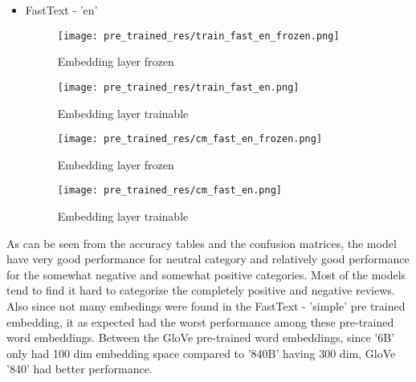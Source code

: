 \documentclass{article}
\begin{document}
\begin{itemize}
\begin{figure}[H]
\begin{minipage}{.5\textwidth}
    \end{minipage}
    \end{figure}
    
    \newpage
    \item FastText - 'en'
    \begin{figure}[H]
    \centering
    \begin{minipage}{.5\linewidth}
        \centering
        \texttt{[image: pre\_trained\_res/train\_fast\_en\_frozen.png]}
        \vspace{-1.0em}
        \caption{Embedding layer frozen}

    \end{minipage}%
    \begin{minipage}{.5\textwidth}
      \centering
      \texttt{[image: pre\_trained\_res/train\_fast\_en.png]}
      \vspace{-1.0em}
      \caption{Embedding layer trainable}

    \end{minipage}
    \end{figure}
    \begin{figure}[H]
    \centering
    \begin{minipage}{.5\linewidth}
        \centering
        \texttt{[image: pre\_trained\_res/cm\_fast\_en\_frozen.png]}
        \vspace{-2.2em}
        \caption{Embedding layer frozen}

    \end{minipage}%
    \begin{minipage}{.5\textwidth}
      \centering
      \texttt{[image: pre\_trained\_res/cm\_fast\_en.png]}
      \vspace{-2.2em}
      \caption{Embedding layer trainable}

    \end{minipage}
    \end{figure}
\end{itemize}

\noindent
As can be seen from the accuracy tables and the confusion matrices, the model have very good performance for neutral category and relatively good performance for the somewhat negative and somewhat positive categories. Most of the models tend to find it hard to categorize the completely positive and negative reviews. Also since not many embedings were found in the FastText - ’simple’ pre trained embedding, it as expected had the worst performance among these pre-trained word embeddings. Between the GloVe pre-trained word embeddings, since '6B' only had 100 dim embedding space compared to '840B' having 300 dim, GloVe '840' had better performance.\\
\end{document}
